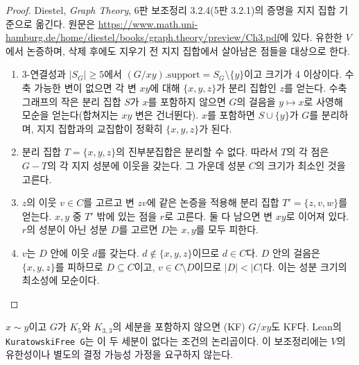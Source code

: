 \begin{proof}
\leanok
Diestel, \emph{Graph Theory}, 6판 보조정리 3.2.4(5판 3.2.1)의 증명을 지지 집합 기준으로 옮긴다.
원문은 \url{https://www.math.uni-hamburg.de/home/diestel/books/graph.theory/preview/Ch3.pdf}에 있다.
유한한 \(V\)에서 논증하며, 삭제 후에도 지우기 전 지지 집합에서 살아남은 점들을 대상으로 한다.
\begin{enumerate}
  \item 3-연결성과 \(|S_G|\ge5\)에서 \((G/xy).\mathrm{support}=S_G\setminus\{y\}\)이고 크기가 4 이상이다.
        수축 가능한 변이 없으면 각 변 \(xy\)에 대해 \(\{x,y,z\}\)가 분리 집합인 \(z\)를 얻는다.
        수축 그래프의 작은 분리 집합 \(S\)가 \(x\)를 포함하지 않으면 \(G\)의 걸음을 \(y\mapsto x\)로
        사영해 모순을 얻는다(합쳐지는 \(xy\) 변은 건너뛴다). \(x\)를 포함하면 \(S\cup\{y\}\)가
        \(G\)를 분리하며, 지지 집합과의 교집합이 정확히 \(\{x,y,z\}\)가 된다.
  \item 분리 집합 \(T=\{x,y,z\}\)의 진부분집합은 분리할 수 없다. 따라서 \(T\)의 각 점은
        \(G-T\)의 각 지지 성분에 이웃을 갖는다. 그 가운데 성분 \(C\)의 크기가 최소인 것을 고른다.
  \item \(z\)의 이웃 \(v\in C\)를 고르고 변 \(zv\)에 같은 논증을 적용해 분리 집합
        \(T'=\{z,v,w\}\)를 얻는다. \(x,y\) 중 \(T'\) 밖에 있는 점을 \(r\)로 고른다.
        둘 다 남으면 변 \(xy\)로 이어져 있다. \(r\)의 성분이 아닌 성분 \(D\)를 고르면 \(D\)는
        \(x,y\)를 모두 피한다.
  \item \(v\)는 \(D\) 안에 이웃 \(d\)를 갖는다. \(d\notin\{x,y,z\}\)이므로 \(d\in C\)다.
        \(D\) 안의 걸음은 \(\{x,y,z\}\)를 피하므로 \(D\subseteq C\)이고, \(v\in C\setminus D\)이므로
        \(|D|<|C|\)다. 이는 성분 크기의 최소성에 모순이다.
\end{enumerate}
\end{proof}

\begin{lemma}[들어 올리기]
\label{lem:lift}
\leanok
\(x \sim y\)이고 \(G\)가 \(K_5\)와 \(K_{3,3}\)의 세분을 포함하지 않으면 (KF) \(G/xy\)도 KF다.
Lean의 \texttt{KuratowskiFree G}는 이 두 세분이 없다는 조건의 논리곱이다. 이 보조정리에는 \(V\)의
유한성이나 별도의 결정 가능성 가정을 요구하지 않는다.
\end{lemma}

